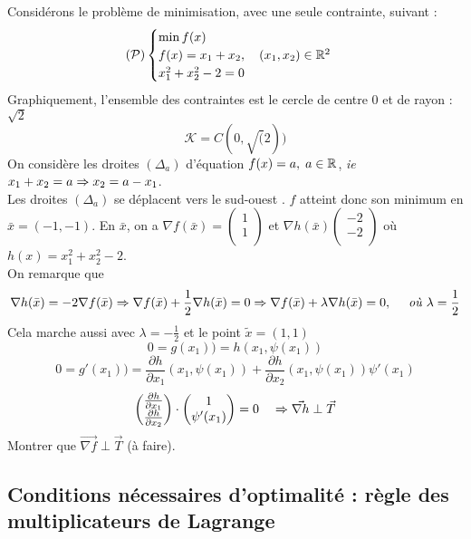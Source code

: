 \begin{exemple}
	Considérons le problème de minimisation, avec une seule contrainte, suivant : 
	\[ (\mathcal{P})\begin{cases}\min f(x) \\ f(x)=x_1+x_2, \quad (x_1,x_2)\in\mathbb{R}^2 \\ x_1^2+x_2^2-2=0 \end{cases} \]
	Graphiquement, l'ensemble des contraintes est le cercle de centre 0 et de rayon : $\sqrt 2$ \[ \mathcal{K} = C(0, \sqrt(2)) \]
	On considère les droites $(\Delta_a)$ d'équation $f(x)=a, \; a\in\mathbb{R}$, \textit{ie} $x_1+x_2=a \Rightarrow x_2=a-x_1$.\\
	Les droites $(\Delta_a)$ se déplacent vers le \og sud-ouest \fg. $f$ atteint donc son minimum en $\bar{x} = (-1, -1)$.
	En $\bar{x}$, on a $\displaystyle \nabla f(\bar{x}) = \begin{pmatrix} 1\\ 1\\ \end{pmatrix} $ et $\displaystyle \nabla h(\bar{x}) \begin{pmatrix} -2\\ -2\\ \end{pmatrix}  $ où $h(x) = x_1^2 + x_2^2 - 2$.\\
	On remarque que \[ \nabla h( \bar{x} ) = -2  \nabla f(\bar{x}) \Rightarrow \nabla f(\bar{x})+\frac{1}{2}\nabla h(\bar{x})=0 \Rightarrow \nabla f(\bar{x})+\lambda\nabla h(\bar{x})=0, \quad\textit{ où }\lambda=\frac{1}{2}\]
	Cela marche aussi avec $\lambda= -\frac{1}{2}$ et le point $\tilde{x}=(1,1)$
	\[ 0=g(x_1))=h(x_1,\psi(x_1)) \]
	\[ 0=g'(x_1))=\frac{\partial h}{\partial x_1}(x_1,\psi(x_1))+\frac{\partial h}{\partial x_2}(x_1,\psi(x_1))\psi'(x_1) \]
	\[ \begin{pmatrix} \frac{\partial h}{\partial x_1}\\ \frac{\partial h}{\partial x_2}\\ \end{pmatrix} \cdot \begin{pmatrix} 1\\ \psi'(x_1)\\ \end{pmatrix}=0 \quad \Rightarrow \vec{\nabla h} \perp \vec{T} \]
	Montrer que $\vec{\nabla f} \perp \vec{T}$ (à faire).
\end{exemple}

\subsection{Conditions nécessaires d'optimalité : règle des multiplicateurs de Lagrange}

